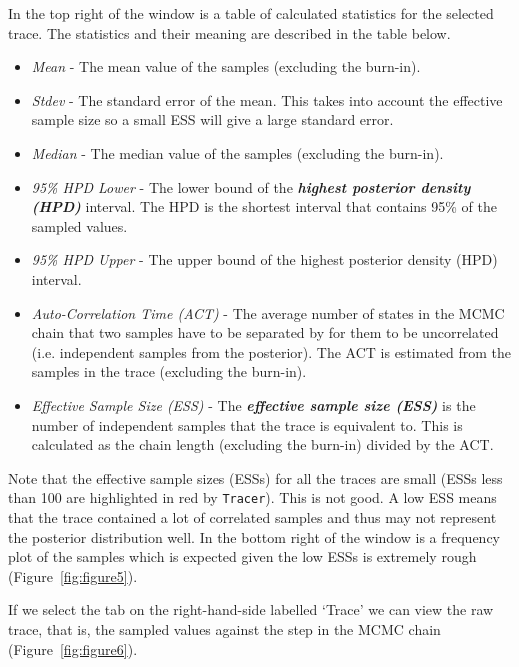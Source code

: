 \documentclass[cup7b, english]{cupbook}
\begin{document}
In the top right of the window is a table of calculated statistics for the selected trace.
The statistics and their meaning are described in the table below.

\begin{itemize}
\item \emph{Mean} -
The mean value of the samples (excluding the burn-in).
\item \emph{Stdev} -
The standard error of the mean. This takes into account the effective sample size so a
small ESS will give a large standard error.
\item \emph{Median} -
The median value of the samples (excluding the burn-in).
\item \emph{95\% HPD Lower} -
The lower bound of the \textbf{\textit{highest posterior density (HPD)}} interval. The HPD is the shortest interval
that contains 95\% of the sampled values.
\item \emph{95\% HPD Upper} -
The upper bound of the highest posterior density (HPD) interval.
\item \emph{Auto-Correlation Time (ACT)} -
The average number of states in the MCMC chain that two samples have to be separated by for them
to be uncorrelated (i.e. independent samples from the posterior). The ACT is estimated from the
samples in the trace (excluding the burn-in).
\item \emph{Effective Sample Size (ESS)} -
The \textbf{\textit{effective sample size (ESS)}} is the number of independent samples that the trace is equivalent to. This is
calculated as the chain length (excluding the burn-in) divided by the ACT.
\end{itemize}

Note that the effective sample sizes (ESSs) for all the traces are small (ESSs less than
100 are highlighted in red by \texttt{Tracer}). This is not good. A low ESS means that the trace
contained a lot of correlated samples and thus may not represent the posterior distribution
well. In the bottom right of the window is a frequency plot of the samples which is
expected given the low ESSs is extremely rough (Figure~\ref{fig:figure5}).

If we select the tab on the right-hand-side labelled `Trace' we can view the raw trace,
that is, the sampled values against the  step in the MCMC chain (Figure~\ref{fig:figure6}).
\end{document}

